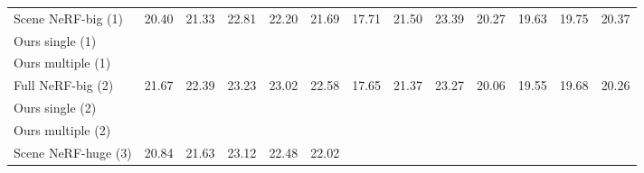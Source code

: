 \begin{table*}[ht!]
{\begin{tabular}{l|*{5}{c}|*{7}{c}|}
        \hline
        Scene NeRF-big (1)  & 20.40 & 21.33 & 22.81 & 22.20 & \multicolumn{1}{|c|}{21.69}
                            & 17.71 & 21.50 & 23.39 & 20.27 & 19.63 & 19.75 & \multicolumn{1}{|c|}{20.37} \\
        Ours single (1)         & \cellcolor{yellow!50}{20.64} & \cellcolor{yellow!50}{21.60} & \cellcolor{yellow!50}{22.94} & \cellcolor{yellow!50}{22.25} & \multicolumn{1}{|c|}{\cellcolor{yellow!50}{21.86}}
                                & \cellcolor{yellow!50}{17.77} & \cellcolor{yellow!50}{21.52} & \cellcolor{yellow!50}{23.55} & \cellcolor{yellow!50}{20.40} & \cellcolor{yellow!50}{19.72} & \cellcolor{yellow!50}{19.76} & \multicolumn{1}{|c|}{\cellcolor{yellow!50}{20.45}} \\
        Ours multiple (1)   & \cellcolor{orange!50}{20.76} & \cellcolor{orange!50}{21.92} & \cellcolor{orange!50}{23.21} & \cellcolor{orange!50}{22.35} & \multicolumn{1}{|c|}{\cellcolor{orange!50}{22.06}}
                            & \cellcolor{orange!50}{18.11} & \cellcolor{orange!50}{21.55} & \cellcolor{orange!50}{23.49} & \cellcolor{orange!50}{20.46} & \cellcolor{orange!50}{19.91} & \cellcolor{orange!50}{20.02} & \multicolumn{1}{|c|}{\cellcolor{orange!50}{20.59}} \\
        \hline
        Full NeRF-big (2)   & 21.67 & 22.39 & 23.23 & 23.02 & \multicolumn{1}{|c|}{22.58}
                            & 17.65 & 21.37 & 23.27 & 20.06 & 19.55 & 19.68 & \multicolumn{1}{|c|}{20.26} \\
        Ours single (2)         & \cellcolor{yellow!50}{21.78} & \cellcolor{yellow!50}{22.41} & \cellcolor{yellow!50}{23.35} & \cellcolor{yellow!50}{23.05} & \multicolumn{1}{|c|}{\cellcolor{yellow!50}{22.65}}
                                & \cellcolor{yellow!50}{17.77} & \cellcolor{yellow!50}{21.40} & \cellcolor{yellow!50}{23.44} & \cellcolor{yellow!50}{20.23} & \cellcolor{yellow!50}{19.64} & \cellcolor{yellow!50}{19.69} & \multicolumn{1}{|c|}{\cellcolor{yellow!50}{20.36}} \\
        Ours multiple (2)   & \cellcolor{orange!50}{21.86} & \cellcolor{orange!50}{22.62} & \cellcolor{orange!50}{23.60} & \cellcolor{orange!50}{23.13} & \multicolumn{1}{|c|}{\cellcolor{orange!50}{22.80}}
                            & \cellcolor{orange!50}{18.13} & \cellcolor{orange!50}{21.45} & \cellcolor{orange!50}{23.42} & \cellcolor{orange!50}{20.33} & \cellcolor{orange!50}{19.87} & \cellcolor{orange!50}{20.01} & \multicolumn{1}{|c|}{\cellcolor{orange!50}{20.53}} \\
        \hline
        Scene NeRF-huge (3) & 20.84 & 21.63 & 23.12 & 22.48 & \multicolumn{1}{|c|}{22.02}

\end{tabular}}
\end{table*}
